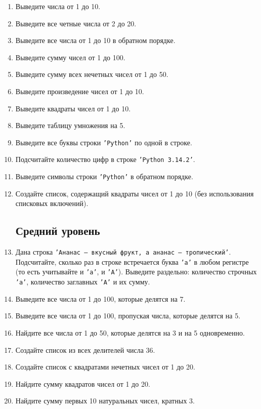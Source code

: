 \documentclass[a4,12pt]{article}
\theoremstyle{remark}
\begin{document}
\begin{enumerate}
    \subsection*{Начальный уровень}
    \item Выведите числа от 1 до 10.
    \item Выведите все четные числа от 2 до 20.
    \item Выведите все числа от 1 до 10 в обратном порядке.
    \item Выведите сумму чисел от 1 до 100.
    \item Выведите сумму всех нечетных чисел от 1 до 50.
    \item Выведите произведение чисел от 1 до 10.
    \item Выведите квадраты чисел от 1 до 10.
    \item Выведите таблицу умножения на 5.
    \item Выведите все буквы строки \texttt{'Python'} по одной в строке.

    \item Подсчитайте количество цифр в строке \texttt{'Python 3.14.2'}.
    \item Выведите символы строки \texttt{'Python'} в обратном порядке.

    \item Создайте список, содержащий квадраты чисел от 1 до 10
    (без использования списковых включений).

    \subsection*{Средний уровень}
    \item Дана строка \texttt{'Ананас — вкусный фрукт, а ананас — тропический'}.
    Подсчитайте, сколько раз в строке встречается буква \texttt{'а'}
    в любом регистре (то есть учитывайте и \texttt{'а'}, и \texttt{'А'}).
    Выведите раздельно: количество строчных \texttt{'а'}, количество
    заглавных \texttt{'А'} и их сумму.
    \item Выведите все числа от 1 до 100, которые делятся на 7.
    \item Выведите все числа от 1 до 100, пропуская числа, которые делятся на 5.
    \item Найдите все числа от 1 до 50, которые делятся на 3 и на 5 одновременно.
    \item Создайте список из всех делителей числа 36.
    \item Создайте список с квадратами нечетных чисел от 1 до 20.
    \item Найдите сумму квадратов чисел от 1 до 20.
    \item Найдите сумму первых 10 натуральных чисел, кратных 3.


\end{enumerate}
\end{document}
